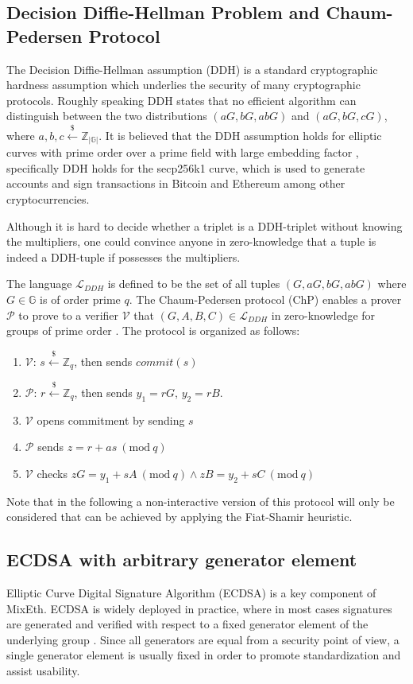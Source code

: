 \documentclass[conference, compsoc]{IEEEtran}
\theoremstyle{definition}
\newcommand{\Mod}[1]{\ (\mathrm{mod}\ #1)}
\begin{document}
\subsection{Decision Diffie-Hellman Problem and Chaum-Pedersen Protocol}

The Decision Diffie-Hellman assumption (DDH) is a standard cryptographic hardness assumption which underlies the security of many cryptographic protocols. Roughly speaking DDH states that no efficient algorithm can distinguish between the two distributions $(aG, bG, abG)$ and $(aG, bG, cG)$, where $a,b,c\stackrel{\$}{\leftarrow}\mathbb{Z}_{|\mathbb{G}|}$. It is believed that the DDH assumption holds for elliptic curves with prime order over a prime field with large embedding factor \cite{boneh1998decision}, specifically DDH holds for the secp256k1 curve, which is used to generate accounts and sign transactions in Bitcoin and Ethereum among other cryptocurrencies. 

Although it is hard to decide whether a triplet is a DDH-triplet without knowing the multipliers, one could convince anyone in zero-knowledge that a tuple is indeed a DDH-tuple if possesses the multipliers.    

The language $\mathcal{L}_{DDH}$ is defined to be the set of all tuples $(G,aG,bG,abG)$ where $G\in \mathbb{G}$ is of order prime $q$. The Chaum-Pedersen protocol (ChP) enables a prover $\mathcal{P}$ to prove to a verifier $\mathcal{V}$ that $(G,A,B,C)\in\mathcal{L}_{DDH}$ in zero-knowledge for groups of prime order \cite{chaum1992wallet}. The protocol is organized as follows:

\begin{enumerate}
	\item $\mathcal{V}$: $s\stackrel{\$}{\leftarrow}\mathbb{Z}_q$, then sends $commit(s)$ 
	\item $\mathcal{P}$: $r\stackrel{\$}{\leftarrow}\mathbb{Z}_q$, then sends $y_1=rG$, $y_2=rB$.
	\item $\mathcal{V}$ opens commitment by sending $s$
	\item $\mathcal{P}$ sends $z=r+as \Mod{q}$
	\item $\mathcal{V}$ checks $zG=y_{1}+sA \Mod{q} \land zB=y_{2}+sC \Mod{q}$
\end{enumerate} 
Note that in the following a non-interactive version of this protocol will only be considered that can be achieved by applying the Fiat-Shamir heuristic. 

\subsection{ECDSA with arbitrary generator element}
Elliptic Curve Digital Signature Algorithm (ECDSA) is a key component of MixEth. ECDSA is widely deployed in practice, where in most cases signatures are generated and verified with respect to a fixed generator element of the underlying group \cite{fersch2016provable}. Since all generators are equal from a security point of view, a single generator element is usually fixed in order to promote standardization and assist usability.
\end{document}
